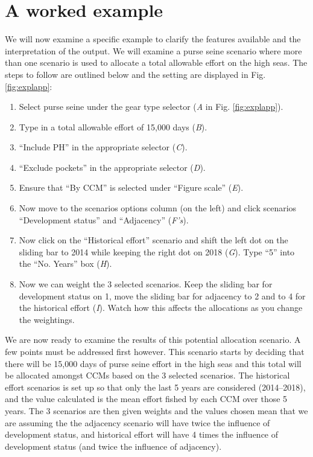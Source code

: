 \documentclass[11pt]{article}
\begin{document}
\section{A worked example} \label{sec:expl}
We will now examine a specific example to clarify the features available and the interpretation of the output. We will examine a purse seine scenario where more than one scenario is used to allocate a total allowable effort on the high seas. The steps to follow are outlined below and the setting are displayed in Fig. \ref{fig:explapp}:
\begin{enumerate}
\item Select purse seine under the gear type selector ({\it A} in Fig. \ref{fig:explapp}).
\item Type in a total allowable effort of 15,000 days ({\it B}).
\item ``Include PH'' in the appropriate selector ({\it C}).
\item ``Exclude pockets'' in the appropriate selector ({\it D}).
\item Ensure that ``By CCM'' is selected under ``Figure scale'' ({\it E}).
\item Now move to the scenarios options column (on the left) and click scenarios ``Development status'' and ``Adjacency'' ({\it F's}).
\item Now click on the ``Historical effort'' scenario and shift the left dot on the sliding bar to 2014 while keeping the right dot on 2018 ({\it G}). Type ``5'' into the ``No. Years'' box ({\it H}).
\item Now we can weight the 3 selected scenarios. Keep the sliding bar for development status on 1, move the sliding bar for adjacency to 2 and to 4 for the historical effort ({\it I}). Watch how this affects the allocations as you change the weightings.
\end{enumerate}
We are now ready to examine the results of this potential allocation scenario. A few points must be addressed first however. This scenario starts by deciding that there will be 15,000 days of purse seine effort in the high seas and this total will be allocated amongst CCMs based on the 3 selected scenarios. The historical effort scenarios is set up so that only the last 5 years are considered (2014--2018), and the value calculated is the mean effort fished by each CCM over those 5 years. The 3 scenarios are then given weights and the values chosen mean that we are assuming the the adjacency scenario will have twice the influence of development status, and historical effort will have 4 times the influence of development status (and twice the influence of adjacency).
\end{document}
